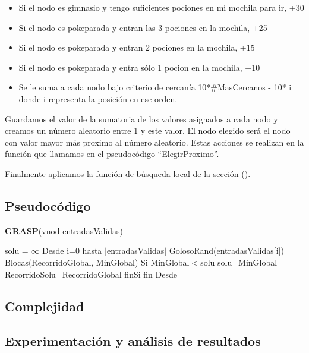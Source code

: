 \documentclass[spanish,12pt]{article}
\begin{document}
\begin{itemize}
	\item Si el nodo es gimnasio y tengo suficientes pociones en mi mochila para ir, +30
	\item Si el nodo es pokeparada y entran las 3 pociones en la mochila, +25
	\item Si el nodo es pokeparada y entran 2 pociones en la mochila, +15
	\item Si el nodo es pokeparada y entra sólo 1 pocion en la mochila, +10
	\item Se le suma a cada nodo  bajo criterio de cercanía 10*$\# $MasCercanos - 10* i donde i representa la posición en ese orden.
\end{itemize} 

Guardamos el valor de la sumatoria de los valores asignados a cada nodo  y creamos un número aleatorio entre 1 y este valor. El nodo elegido será el nodo con valor mayor más proximo al número aleatorio. Estas acciones se realizan en la función que llamamos en el pseudocódigo ``ElegirProximo''. 

Finalmente aplicamos la función de búsqueda local de la sección ().


\subsection{Pseudocódigo}

\begin{algorithm}[H]{\textbf{GRASP}(vnod entradasValidas)}
	\begin{algorithmic}[1]
		\State solu = $\infty$
		\State Desde i=0 hasta $|$entradasValidas$|$
		\State \quad GolosoRand(entradasValidas[i])
		\State \quad Blocas(RecorridoGlobal, MinGlobal)
		\State \quad Si MinGlobal$<$solu
		\State \qquad solu=MinGlobal
		\State \qquad RecorridoSolu=RecorridoGlobal
		\State \quad finSi
		\State fin Desde
		
	\end{algorithmic}
\end{algorithm}


\subsection{Complejidad}

\subsection{Experimentación y análisis de resultados}
\end{document}
